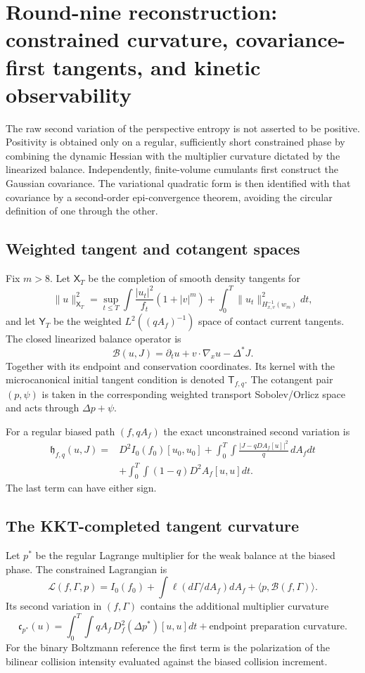\section{Round-nine reconstruction: constrained curvature, covariance-first tangents, and kinetic observability}
\label{sec:r9-b3}

The raw second variation of the perspective entropy is not asserted to be
positive.  Positivity is obtained only on a regular, sufficiently short
constrained phase by combining the dynamic Hessian with the multiplier
curvature dictated by the linearized balance.  Independently, finite-volume
cumulants first construct the Gaussian covariance.  The variational quadratic
form is then identified with that covariance by a second-order epi-convergence
theorem, avoiding the circular definition of one through the other.

\subsection{Weighted tangent and cotangent spaces}

Fix $m>8$.  Let $\mathsf X_T$ be the completion of smooth density tangents for
\[
 \|u\|_{\mathsf X_T}^2
 =\sup_{t\le T}\int\frac{|u_t|^2}{f_t}(1+|v|^m)
 +\int_0^T\|u_t\|_{H^{-1}_{x,v}(w_m)}^2dt,
\]
and let $\mathsf Y_T$ be the weighted $L^2((qA_f)^{-1})$ space of contact
current tangents.  The closed linearized balance operator is
\[
 \mathcal B(u,J)
 =\partial_tu+v\cdot\nabla_xu-\Delta^*J.
\]
Together with its endpoint and conservation coordinates.  Its kernel with the
microcanonical initial tangent condition is denoted $\mathsf T_{f,q}$.
The cotangent pair $(p,\psi)$ is taken in the corresponding weighted transport
Sobolev/Orlicz space and acts through $\Delta p+\psi$.

For a regular biased path $(f,qA_f)$ the exact unconstrained second variation
is
\[
\begin{aligned}
 \mathfrak h_{f,q}(u,J)
 ={}&D^2I_0(f_0)[u_0,u_0]
 +\int_0^T\!\int
 \frac{|J-qDA_f[u]|^2}{q}\,dA_fdt\\
 &+\int_0^T\!\int(1-q)D^2A_f[u,u]dt.
\end{aligned}
\]
The last term can have either sign.

\subsection{The KKT-completed tangent curvature}

Let $p^*$ be the regular Lagrange multiplier for the weak balance at the
biased phase.  The constrained Lagrangian is
\[
 \mathscr L(f,\Gamma,p)
 =I_0(f_0)+\int\ell(d\Gamma/dA_f)dA_f
 +\langle p,\mathcal B(f,\Gamma)\rangle.
\]
Its second variation in $(f,\Gamma)$ contains the additional multiplier
curvature
\[
 \mathfrak c_{p^*}(u)
 =\int_0^T\!\int qA_f\,
  D^2_f(\Delta p^*)[u,u]dt
 +\text{endpoint preparation curvature}.
\]
For the binary Boltzmann reference the first term is the polarization of the
bilinear collision intensity evaluated against the biased collision
increment.

